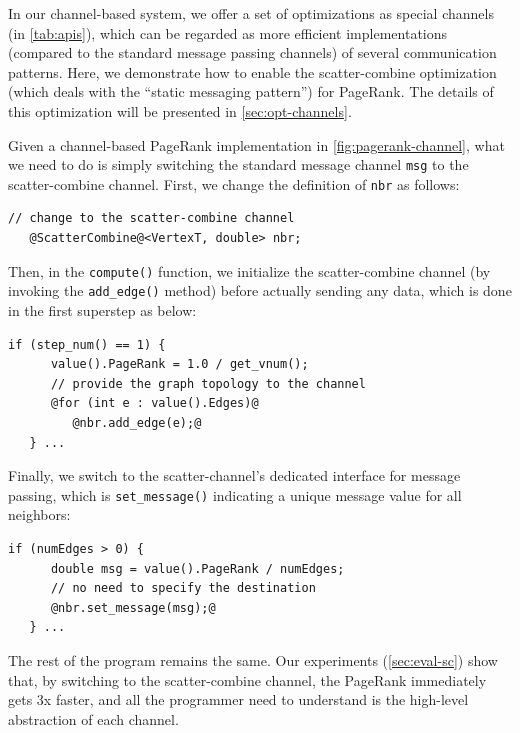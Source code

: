 \documentclass{sokendai_thesis} %
\begin{document}
In our channel-based system, we offer a set of optimizations as special channels (in \autoref{tab:apis}), which can be regarded as more efficient implementations (compared to the standard message passing channels) of several communication patterns.
Here, we demonstrate how to enable the scatter-combine optimization (which deals with the ``static messaging pattern'') for PageRank.
The details of this optimization will be presented in \autoref{sec:opt-channels}.

Given a channel-based PageRank implementation in \autoref{fig:pagerank-channel}, 
what we need to do is simply switching the standard message channel \texttt{msg} to the scatter-combine channel.
First, we change the definition of \texttt{nbr} as follows:
\begin{lstlisting}[style=highlight,firstnumber=5]
   // change to the scatter-combine channel
   @ScatterCombine@<VertexT, double> nbr;
\end{lstlisting}
Then, in the \texttt{compute()} function, we initialize the scatter-combine channel (by invoking the \texttt{add\_edge()} method) before actually sending any data, which is done in the first superstep as below:
\begin{lstlisting}[style=highlight,firstnumber=12]
   if (step_num() == 1) {
      value().PageRank = 1.0 / get_vnum();
      // provide the graph topology to the channel
      @for (int e : value().Edges)@
         @nbr.add_edge(e);@
   } ...
\end{lstlisting}
Finally, we switch to the scatter-channel's dedicated interface for message passing, which is \texttt{set\_message()} indicating a unique message value for all neighbors:
\begin{lstlisting}[style=highlight,firstnumber=22]
   if (numEdges > 0) {
      double msg = value().PageRank / numEdges;
      // no need to specify the destination
      @nbr.set_message(msg);@
   } ...
\end{lstlisting}
The rest of the program remains the same.
Our experiments (\autoref{sec:eval-sc}) show that, by switching to the scatter-combine channel, the PageRank immediately gets 3x faster, and all the programmer need to understand is the high-level abstraction of each channel.
\end{document}
